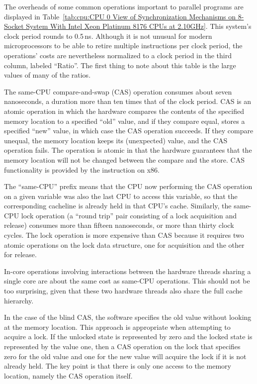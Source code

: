 The overheads of some common operations important to parallel programs are
displayed in
Table~\ref{tab:cpu:CPU 0 View of Synchronization Mechanisms on 8-Socket System With Intel Xeon Platinum 8176 CPUs at 2.10GHz}.
This system's clock period rounds to 0.5\,ns.
Although it is not unusual for modern microprocessors to be able to
retire multiple instructions per clock period, the operations' costs are
nevertheless normalized to a clock period in the third column, labeled
``Ratio''.
The first thing to note about this table is the large values of many of
the ratios.

The same-CPU compare-and-swap (CAS) operation consumes about seven
nanoseconds, a duration more than ten times that of the clock period.
CAS is an atomic operation in which the hardware compares the contents
of the specified memory location to a specified ``old'' value, and if
they compare equal, stores a specified ``new'' value, in which case the
CAS operation succeeds.
If they compare unequal, the memory location keeps its (unexpected) value,
and the CAS operation fails.
The operation is atomic in that the hardware guarantees that the memory
location will not be changed between the compare and the store.
CAS functionality is provided by the  instruction on x86.

The ``same-CPU'' prefix means that the CPU now performing the CAS operation
on a given variable was also the last CPU to access this variable, so
that the corresponding cacheline is already held in that CPU's cache.
Similarly, the same-CPU lock operation (a ``round trip'' pair consisting
of a lock acquisition and release) consumes more than fifteen nanoseconds,
or more than thirty clock cycles.
The lock operation is more expensive than CAS because it requires two
atomic operations on the lock data structure, one for acquisition and
the other for release.

In-core operations involving interactions between the hardware threads
sharing a single core are about the same cost as same-CPU operations.
This should not be too surprising, given that these two hardware threads
also share the full cache hierarchy.

In the case of the blind CAS, the software specifies the old value
without looking at the memory location.
This approach is appropriate when attempting to acquire a lock.
If the unlocked state is represented by zero and the locked state
is represented by the value one, then a CAS operation on the lock
that specifies zero for the old value and one for the new value
will acquire the lock if it is not already held.
The key point is that there is only one access to the memory
location, namely the CAS operation itself.

